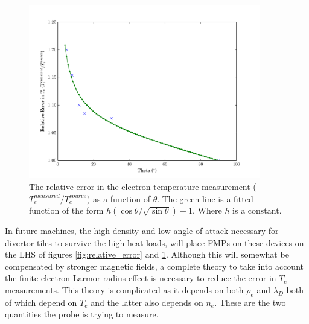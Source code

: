 \begin{figure}[H]
	\centering
	\includegraphics[width=0.9\textwidth]{angle_error.pdf}
	\caption{The relative error in the electron temperature measurement ($T_e^{measured} / T_e ^{source}$) as a function of $\theta$. The green line is a fitted function of the form $h(\cos\theta / \sqrt{\sin\theta})+1$. Where $h$ is a constant. }
	\label{fig:angle_error}
\end{figure}
In future machines, the high density and low angle of attack necessary for divertor tiles to survive the high heat loads, will place FMPs on these devices on the LHS of figures \ref{fig:relative_error} and \ref{fig:angle_error}. Although this will somewhat be compensated by stronger magnetic fields, a complete theory to take into account the finite electron Larmor radius effect is necessary to reduce the error in $T_e$ measurements.  This theory is complicated as it depends on both $\rho_e$ and $\lambda_D$  both of which depend on $T_e$ and the latter also depends on $n_e$. These are the two quantities the probe is trying to measure.





